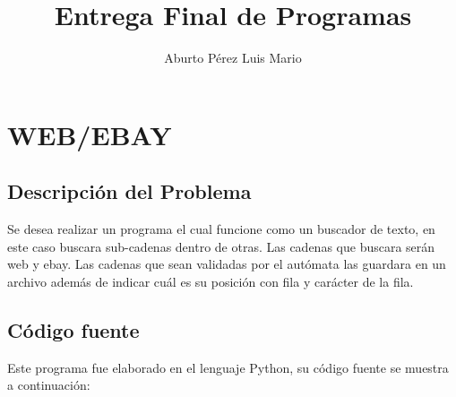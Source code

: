 \documentclass[12pt]{article}
\title{Entrega Final de Programas}
\author{Aburto Pérez Luis Mario}
\begin{document}
\maketitle
\newpage
\tableofcontents
\newpage

\section{WEB/EBAY}
\subsection{Descripción del Problema}

Se desea realizar un programa el cual funcione como un buscador de texto, en este caso buscara sub-cadenas dentro de otras. Las cadenas que buscara serán web y ebay. Las cadenas que sean validadas por el autómata las guardara en un archivo además de indicar cuál es su posición con fila y carácter de la fila.

\subsection{Código fuente}
Este programa fue elaborado en el lenguaje Python, su código fuente se muestra a continuación:
\end{document}
